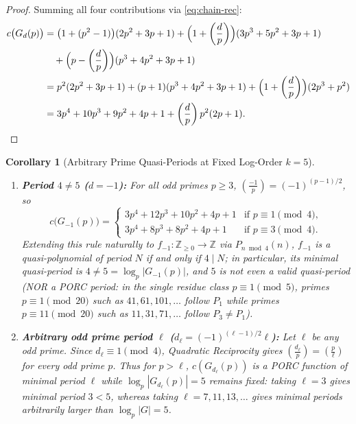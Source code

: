 \documentclass[11pt,a4paper]{article}
\newtheorem{corollary}[theorem]{Corollary}
\theoremstyle{definition}
\newcommand{\Leg}[2]{\left(\frac{#1}{#2}\right)}
\begin{document}
\begin{proof}
Summing all four contributions via \eqref{eq:chain-rec}:
\begin{align*}
  c\bigl(G_d(p)\bigr)
  &= \bigl(1 + (p^2 - 1)\bigr)(2p^2 + 3p + 1)
     + \Bigl(1 + \Leg{d}{p}\Bigr)(3p^3 + 5p^2 + 3p + 1) \\
  &\quad + \Bigl(p - \Leg{d}{p}\Bigr)(p^3 + 4p^2 + 3p + 1) \\
  &= p^2(2p^2 + 3p + 1) + (p + 1)(p^3 + 4p^2 + 3p + 1) + \Bigl(1 + \Leg{d}{p}\Bigr)(2p^3 + p^2) \\
  &= 3p^4 + 10p^3 + 9p^2 + 4p + 1 + \Leg{d}{p} p^2(2p + 1). \qedhere
\end{align*}
\end{proof}

\begin{corollary}[Arbitrary Prime Quasi-Periods at Fixed Log-Order $k = 5$]\label{cor:Gd-periods}
\begin{enumerate}
  \item \textbf{Period $4 \ne 5$ ($d = -1$):} For all odd primes $p \ge 3$, $\Leg{-1}{p} = (-1)^{(p-1)/2}$, so
  \[
    c\bigl(G_{-1}(p)\bigr) = \begin{cases}
      3p^4 + 12p^3 + 10p^2 + 4p + 1 & \text{if } p \equiv 1 \pmod 4, \\
      3p^4 + 8p^3 + 8p^2 + 4p + 1 & \text{if } p \equiv 3 \pmod 4.
    \end{cases}
  \]
  Extending this rule naturally to $f_{-1} : \mathbb{Z}_{\ge 0} \to \mathbb{Z}$ via $P_{n \bmod 4}(n)$, $f_{-1}$ is a quasi-polynomial of period $N$ if and only if $4 \mid N$; in particular, its minimal quasi-period is $4 \ne 5 = \log_p |G_{-1}(p)|$, and $5$ is not even a valid quasi-period (NOR a PORC period: in the single residue class $p \equiv 1 \pmod 5$, primes $p \equiv 1 \pmod{20}$ such as $41, 61, 101, \dots$ follow $P_1$ while primes $p \equiv 11 \pmod{20}$ such as $11, 31, 71, \dots$ follow $P_3 \ne P_1$).
  \item \textbf{Arbitrary odd prime period $\ell$ ($d_\ell = (-1)^{(\ell-1)/2}\ell$):} Let $\ell$ be any odd prime. Since $d_\ell \equiv 1 \pmod 4$, Quadratic Reciprocity gives $\Leg{d_\ell}{p} = \Leg{p}{\ell}$ for every odd prime $p$. Thus for $p > \ell$, $c(G_{d_\ell}(p))$ is a PORC function of minimal period $\ell$ while $\log_p |G_{d_\ell}(p)| = 5$ remains fixed: taking $\ell = 3$ gives minimal period $3 < 5$, whereas taking $\ell = 7, 11, 13, \dots$ gives minimal periods arbitrarily larger than $\log_p |G| = 5$.
\end{enumerate}
\end{corollary}
\end{document}
